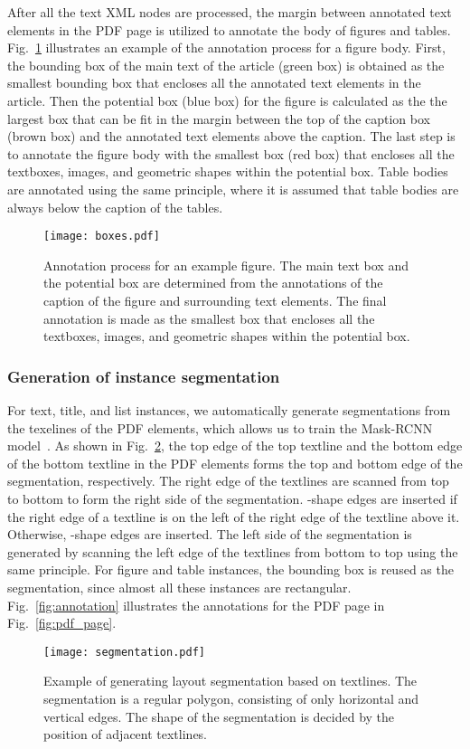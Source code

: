 \documentclass[conference]{IEEEtran}
\begin{document}
After all the text XML nodes are processed, the margin between annotated text elements in the PDF page is utilized to annotate the body of figures and tables. Fig.~\ref{fig:box} illustrates an example of the annotation process for a figure body. First, the bounding box of the main text of the article (green box) is obtained as the smallest bounding box that encloses all the annotated text elements in the article. Then the potential box (blue box) for the figure is calculated as the the largest box that can be fit in the margin between the top of the caption box (brown box) and the annotated text elements above the caption. The last step is to annotate the figure body with the smallest box (red box) that encloses all the textboxes, images, and geometric shapes within the potential box. Table bodies are annotated using the same principle, where it is assumed that table bodies are always below the caption of the tables.
\begin{figure}[!htb]
  \centering
  \texttt{[image: boxes.pdf]}
  \caption{Annotation process for an example figure. The main text box and the potential box are determined from the annotations of the caption of the figure and surrounding text elements. The final annotation is made as the smallest box that encloses all the textboxes, images, and geometric shapes within the potential box.}
  \label{fig:box}
\end{figure}

\subsubsection{Generation of instance segmentation}

For text, title, and list instances, we automatically generate segmentations from the texelines of the PDF elements, which allows us to train the Mask-RCNN model~\cite{he2017mask}. As shown in Fig.~\ref{fig:seg}, the top edge of the top textline and the bottom edge of the bottom textline in the PDF elements forms the top and bottom edge of the segmentation, respectively. The right edge of the textlines are scanned from top to bottom to form the right side of the segmentation. -shape edges are inserted if the right edge of a textline is on the left of the right edge of the textline above it. Otherwise, -shape edges are inserted. The left side of the segmentation is generated by scanning the left edge of the textlines from bottom to top using the same principle. For figure and table instances, the bounding box is reused as the segmentation, since almost all these instances are rectangular. Fig.~\ref{fig:annotation} illustrates the annotations for the PDF page in Fig.~\ref{fig:pdf_page}.
\begin{figure}[!htb]
  \centering
  \texttt{[image: segmentation.pdf]}
  \caption{Example of generating layout segmentation based on textlines. The segmentation is a regular polygon, consisting of only horizontal and vertical edges. The shape of the segmentation is decided by the position of adjacent textlines.}
  \label{fig:seg}
\end{figure}
\end{document}
